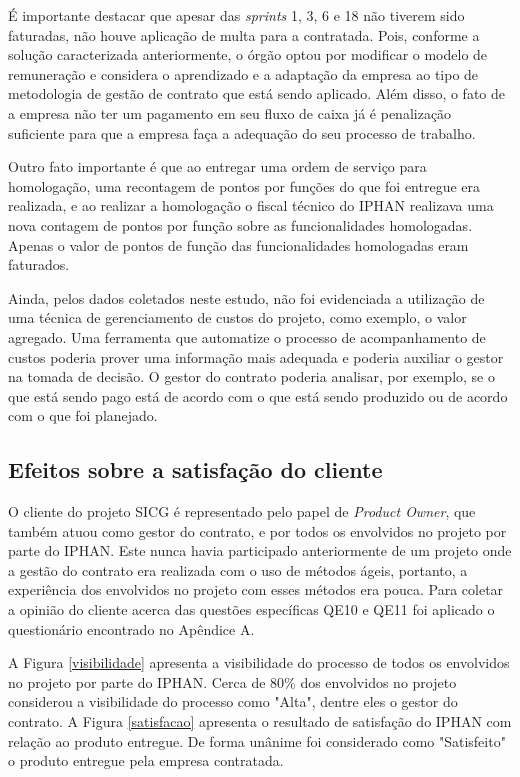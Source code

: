 É importante destacar que apesar das \textit{sprints} 1, 3, 6 e 18 não tiverem sido faturadas, não houve aplicação de multa para a contratada. Pois, conforme a solução caracterizada anteriormente, o órgão optou por modificar o modelo de remuneração e considera o aprendizado e a adaptação da empresa ao tipo de metodologia de gestão de contrato que está sendo aplicado. Além disso, o fato de a empresa não ter um pagamento em seu fluxo de caixa já é penalização suficiente para que a empresa faça a adequação do seu processo de trabalho.

Outro fato importante é que ao entregar uma ordem de serviço para homologação, uma recontagem de pontos por funções do que foi entregue era realizada, e ao realizar a homologação o fiscal técnico do IPHAN realizava uma nova contagem de pontos por função sobre as funcionalidades homologadas. Apenas o valor de pontos de função das funcionalidades homologadas eram faturados. 

Ainda, pelos dados coletados neste estudo, não foi evidenciada a utilização de uma técnica de gerenciamento de custos do projeto, como exemplo, o valor agregado. Uma ferramenta que automatize o processo de acompanhamento de custos poderia prover uma informação mais adequada e poderia auxiliar o gestor na tomada de decisão. O gestor do contrato poderia analisar, por exemplo, se o que está sendo pago está de acordo com o que está sendo produzido ou de acordo com o que foi planejado.

\subsection[Efeitos sobre a satisfação do cliente]{Efeitos sobre a satisfação do cliente}

O cliente do projeto SICG é representado pelo papel de \textit{Product Owner}, que também atuou como gestor do contrato, e por todos os envolvidos no projeto por parte do IPHAN. Este nunca havia participado anteriormente de um projeto onde a gestão do contrato era realizada com o uso de métodos ágeis, portanto, a experiência dos envolvidos no projeto com esses métodos era pouca. Para coletar a opinião do cliente acerca das questões específicas QE10  e QE11 foi aplicado o questionário encontrado no Apêndice A.

A Figura \ref{visibilidade} apresenta a visibilidade do processo de todos os envolvidos no projeto por parte do IPHAN. Cerca de 80\% dos envolvidos no projeto considerou a visibilidade do processo como "Alta", dentre eles o gestor do contrato. A Figura \ref{satisfacao} apresenta o resultado de satisfação do IPHAN com relação ao produto entregue. De forma unânime foi considerado como "Satisfeito" o produto entregue pela empresa contratada. 


